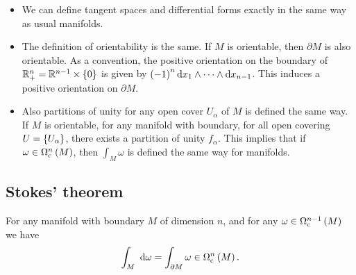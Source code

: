 \begin{remark}
\hfill
\begin{itemize}
\item We can define tangent spaces and differential forms exactly in the same way as usual manifolds.
\item The definition of orientability is the same. If $ M $ is orientable, then $ \partial M $ is also orientable. As a convention, the positive orientation on the boundary of $ \RR_+^n = \RR^{n - 1} \times \cbr{0} $ is given by $ \br{-1}^n \d x_1 \wedge \dots \wedge \d x_{n - 1} $. This induces a positive orientation on $ \partial M $.
\item Also partitions of unity for any open cover $ U_\alpha $ of $ M $ is defined the same way. If $ M $ is orientable, for any manifold with boundary, for all open covering $ U = \cbr{U_\alpha} $, there exists a partition of unity $ f_\alpha $. This implies that if $ \omega \in \Omega_\c^n\br{M} $, then $ \int_M \omega $ is defined the same way for manifolds.
\end{itemize}
\end{remark}

\subsection{Stokes' theorem}

\begin{theorem}[Stokes]
For any manifold with boundary $ M $ of dimension $ n $, and for any $ \omega \in \Omega_\c^{n - 1}\br{M} $ we have
$$ \intd{M}{}{}{\omega} = \int_{\partial M} \omega \in \Omega_\c^n\br{M}. $$
\end{theorem}

\pagebreak

